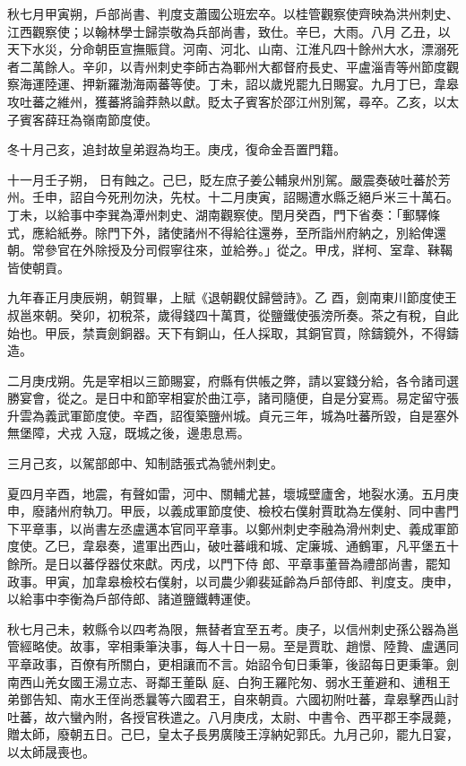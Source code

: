 \begin{pinyinscope}
 秋七月甲寅朔，戶部尚書、判度支蕭國公班宏卒。以桂管觀察使齊映為洪州刺史、江西觀察使；以翰林學士歸崇敬為兵部尚書，致仕。辛巳，大雨。八月
 乙丑，以天下水災，分命朝臣宣撫賑貸。河南、河北、山南、江淮凡四十餘州大水，漂溺死者二萬餘人。辛卯，以青州刺史李師古為鄆州大都督府長史、平盧淄青等州節度觀察海運陸運、押新羅渤海兩蕃等使。丁未，詔以歲兇罷九日賜宴。九月丁巳，韋皋攻吐蕃之維州，獲蕃將論莽熱以獻。貶太子賓客於邵江州別駕，尋卒。乙亥，以太子賓客薛玨為嶺南節度使。



 冬十月己亥，追封故皇弟遐為均王。庚戌，復命金吾置門籍。



 十一月壬子朔，
 日有蝕之。己巳，貶左庶子姜公輔泉州別駕。嚴震奏破吐蕃於芳州。壬申，詔自今死刑勿決，先杖。十二月庚寅，詔賜遭水縣乏絕戶米三十萬石。丁未，以給事中李巽為潭州刺史、湖南觀察使。閏月癸酉，門下省奏：「郵驛條式，應給紙券。除門下外，諸使諸州不得給往還券，至所詣州府納之，別給俾還朝。常參官在外除授及分司假寧往來，並給券。」從之。甲戌，牂柯、室韋、靺鞨皆使朝貢。



 九年春正月庚辰朔，朝賀畢，上賦《退朝觀仗歸營詩》。乙
 酉，劍南東川節度使王叔邕來朝。癸卯，初稅茶，歲得錢四十萬貫，從鹽鐵使張滂所奏。茶之有稅，自此始也。甲辰，禁賣劍銅器。天下有銅山，任人採取，其銅官買，除鑄鏡外，不得鑄造。



 二月庚戌朔。先是宰相以三節賜宴，府縣有供帳之弊，請以宴錢分給，各令諸司選勝宴會，從之。是日中和節宰相宴於曲江亭，諸司隨便，自是分宴焉。易定留守張升雲為義武軍節度使。辛酉，詔復築鹽州城。貞元三年，城為吐蕃所毀，自是塞外無堡障，犬戎
 入寇，既城之後，邊患息焉。



 三月己亥，以駕部郎中、知制誥張式為虢州刺史。



 夏四月辛酉，地震，有聲如雷，河中、關輔尤甚，壞城壁廬舍，地裂水湧。五月庚申，廢諸州府執刀。甲辰，以義成軍節度使、檢校右僕射賈耽為左僕射、同中書門下平章事，以尚書左丞盧邁本官同平章事。以鄭州刺史李融為滑州刺史、義成軍節度使。乙巳，韋皋奏，遣軍出西山，破吐蕃峨和城、定廉城、通鶴軍，凡平堡五十餘所。是日以蕃俘器仗來獻。丙戌，以門下侍
 郎、平章事董晉為禮部尚書，罷知政事。甲寅，加韋皋檢校右僕射，以司農少卿裴延齡為戶部侍郎、判度支。庚申，以給事中李衡為戶部侍郎、諸道鹽鐵轉運使。



 秋七月己未，敕縣令以四考為限，無替者宜至五考。庚子，以信州刺史孫公器為邕管經略使。故事，宰相秉筆決事，每人十日一易。至是賈耽、趙憬、陸贄、盧邁同平章政事，百僚有所關白，更相讓而不言。始詔令旬日秉筆，後詔每日更秉筆。劍南西山羌女國王湯立志、哥鄰王董臥
 庭、白狗王羅陀匆、弱水王董避和、逋租王弟鄧告知、南水王侄尚悉曩等六國君王，自來朝貢。六國初附吐蕃，韋皋擊西山討吐蕃，故六蠻內附，各授官秩遣之。八月庚戌，太尉、中書令、西平郡王李晟薨，贈太師，廢朝五日。己巳，皇太子長男廣陵王淳納妃郭氏。九月己卯，罷九日宴，以太師晟喪也。




\end{pinyinscope}
